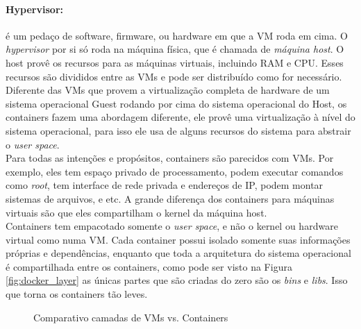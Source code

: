 \documentclass[twocolumn, letterpaper]{scrartcl}
\begin{document}
\paragraph{Hypervisor:} é um pedaço de software, firmware, ou hardware em que a VM roda em cima. O \textit{hypervisor} por si só roda na máquina física, que é chamada de \textit{máquina host}. O host provê os recursos para as máquinas virtuais, incluindo RAM e CPU. Esses recursos são divididos entre as VMs e pode ser distribuído como for necessário.\\

\noindent Diferente das VMs que provem a virtualização completa de hardware de um sistema operacional Guest rodando por cima do sistema operacional do Host, os containers fazem uma abordagem diferente, ele provê uma virtualização à nível do sistema operacional, para isso ele usa de alguns recursos do sistema para abstrair o \textit{user space}.\\
Para todas as intenções e propósitos, containers são parecidos com VMs. Por exemplo, eles tem espaço privado de processamento, podem executar comandos como \textit{root}, tem interface de rede privada e endereços de IP, podem montar sistemas de arquivos, e etc. A grande diferença dos containers para máquinas virtuais são que eles compartilham o kernel da máquina host.\\ 
Containers tem empacotado somente o \textit{user space}, e não o kernel ou hardware virtual como numa VM. Cada container possui isolado somente suas informações próprias e dependências, enquanto que toda a arquitetura do sistema operacional é compartilhada entre os containers, como pode ser visto na Figura \ref{fig:docker_layer} as únicas partes que são criadas do zero são os \textit{bins} e \textit{libs}. Isso que torna os containers tão leves.

\begin{figure}[!tbp]
\centering
    \hfill
    \caption{Comparativo camadas de VMs vs. Containers}
\end{figure}
\end{document}

